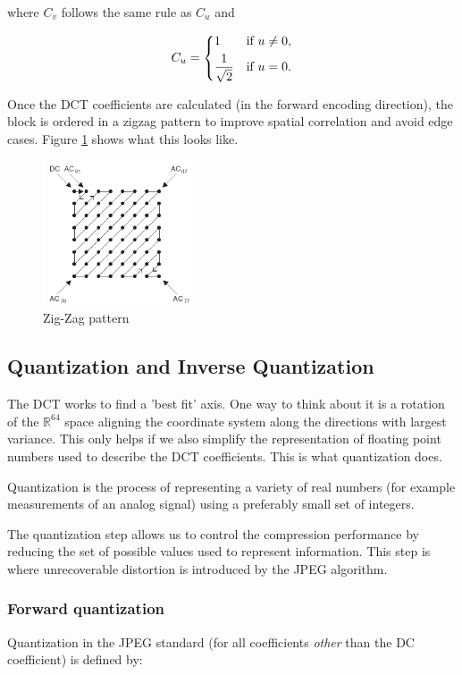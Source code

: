 \documentclass[11pt,a4paper]{article}
\begin{document}
where $C_v$ follows the same rule as $C_u$ and

\begin{align*}
C_u = 
	\begin{dcases}
		1 \quad &\text{if $u\neq 0$,} \\
		\frac{1}{\sqrt{2}} &\text{if $u = 0$.}
	\end{dcases}
\end{align*}

Once the DCT coefficients are calculated (in the forward encoding direction), the block is ordered in a zigzag pattern to improve spatial correlation and avoid edge cases. Figure \ref{zz:pattern} shows what this looks like.

\begin{figure}[ht]
\centering
\includegraphics[width=0.4\textwidth]{zz}
\caption{Zig-Zag pattern}
\label{zz:pattern}
\end{figure}

\subsection{Quantization and Inverse Quantization}
The DCT works to find a 'best fit' axis. One way to think about it is a rotation of the $\mathbb{R}^{64}$ space aligning the coordinate system along the directions with largest variance. This only helps if we also simplify the representation of floating point numbers used to describe the DCT coefficients. This is what quantization does.

Quantization is the process of representing a variety of real numbers (for example measurements of an analog signal) using a preferably small set of integers.

The quantization step allows us to control the compression performance by reducing the set of possible values used to represent information. This step is where unrecoverable distortion is introduced by the JPEG algorithm.

\subsubsection*{Forward quantization}
Quantization in the JPEG standard (for all coefficients \textit{other} than the DC coefficient) is defined by:
\end{document}
